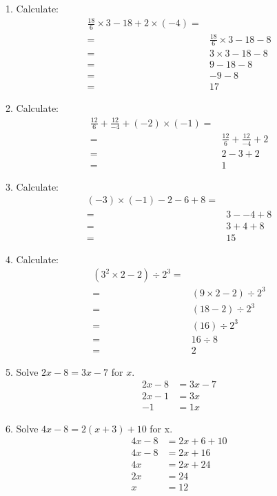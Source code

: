 
1. Calculate:
\begin{align*}
    \frac{18}{6}\times 3 - 18 + 2 \times (-4) =&\\
    =& \frac{18}{6} \times 3 - 18 - 8 \\
    =& 3\times 3 - 18 - 8\\
    =& 9 - 18-8\\
    =&-9-8\\
    =&17
\end{align*}

2. Calculate:
\begin{align*}
    \frac{12}{6} + \frac{12}{-4} + (-2)\times (-1) =&\\
    =& \frac{12}{6} + \frac{12}{-4} + 2\\
    =& 2-3+2\\
    =& 1
\end{align*}

3. Calculate:
\begin{align*}
    (-3)\times(-1)-2-6+8 =&\\
    =& 3--4 + 8\\
    =& 3+4 + 8\\
    =& 15
\end{align*}

4. Calculate:
\begin{align*}
    (3^2\times 2 -2) \div 2^3 =&\\
    =& (9 \times 2 - 2) \div 2^3\\
    =& (18-2) \div 2^3\\
    =& (16) \div 2^3\\
    =& 16 \div 8\\
    =& 2
\end{align*}

5. Solve $\displaystyle 2x-8=3x-7$ for $x$.
\begin{align*}
    2x-8&=3x-7\\
    2x-1&=3x\\
    -1 &= 1x
\end{align*}

6. Solve $\displaystyle 4x-8 = 2(x+3)+10$ for x.
\begin{align*}
    4x-8 &= 2x+6+10\\
    4x-8 &= 2x+16\\
    4x &= 2x+24\\
    2x &= 24\\
    x &= 12
\end{align*}

